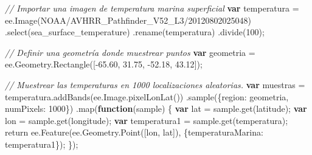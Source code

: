 \documentclass[
  12pt,
  letterpaper,
  twoside]{book}
\newenvironment{Shaded}{\begin{snugshade}}{\end{snugshade}}
\newcommand{\AttributeTok}[1]{\textcolor[rgb]{0.48,0.12,0.64}{#1}}
\newcommand{\CommentTok}[1]{\textcolor[rgb]{0.24,0.58,0.00}{\textit{#1}}}
\newcommand{\ControlFlowTok}[1]{\textcolor[rgb]{0.00,0.00,0.00}{#1}}
\newcommand{\DataTypeTok}[1]{\textcolor[rgb]{0.00,0.00,0.00}{#1}}
\newcommand{\DecValTok}[1]{\textcolor[rgb]{0.28,0.53,0.93}{#1}}
\newcommand{\FloatTok}[1]{\textcolor[rgb]{0.28,0.53,0.93}{#1}}
\newcommand{\FunctionTok}[1]{\textcolor[rgb]{0.48,0.12,0.64}{#1}}
\newcommand{\KeywordTok}[1]{\textcolor[rgb]{0.00,0.00,0.00}{\textbf{#1}}}
\newcommand{\NormalTok}[1]{#1}
\newcommand{\OperatorTok}[1]{\textcolor[rgb]{0.00,0.00,0.00}{#1}}
\newcommand{\StringTok}[1]{\textcolor[rgb]{0.87,0.29,0.22}{#1}}
\begin{document}
\begin{Shaded}
\begin{Highlighting}[]
\CommentTok{// Importar una imagen de temperatura marina superficial}
\KeywordTok{var}\NormalTok{ temperatura }\OperatorTok{=}\NormalTok{ ee}\OperatorTok{.}\FunctionTok{Image}\NormalTok{(}\StringTok{\textquotesingle{}NOAA/AVHRR\_Pathfinder\_V52\_L3/20120802025048\textquotesingle{}}\NormalTok{)}
  \OperatorTok{.}\FunctionTok{select}\NormalTok{(}\StringTok{\textquotesingle{}sea\_surface\_temperature\textquotesingle{}}\NormalTok{)}
  \OperatorTok{.}\FunctionTok{rename}\NormalTok{(}\StringTok{\textquotesingle{}temperatura\textquotesingle{}}\NormalTok{)}
  \OperatorTok{.}\FunctionTok{divide}\NormalTok{(}\DecValTok{100}\NormalTok{)}\OperatorTok{;}

\CommentTok{// Definir una geometría donde muestrear puntos}
\KeywordTok{var}\NormalTok{ geometria }\OperatorTok{=}\NormalTok{ ee}\OperatorTok{.}\AttributeTok{Geometry}\OperatorTok{.}\FunctionTok{Rectangle}\NormalTok{([}\OperatorTok{{-}}\FloatTok{65.60}\OperatorTok{,} \FloatTok{31.75}\OperatorTok{,} \OperatorTok{{-}}\FloatTok{52.18}\OperatorTok{,} \FloatTok{43.12}\NormalTok{])}\OperatorTok{;}

\CommentTok{// Muestrear las temperaturas en 1000 localizaciones aleatorias.}
\KeywordTok{var}\NormalTok{ muestras }\OperatorTok{=}\NormalTok{ temperatura}\OperatorTok{.}\FunctionTok{addBands}\NormalTok{(ee}\OperatorTok{.}\AttributeTok{Image}\OperatorTok{.}\FunctionTok{pixelLonLat}\NormalTok{())}
  \OperatorTok{.}\FunctionTok{sample}\NormalTok{(\{}\DataTypeTok{region}\OperatorTok{:}\NormalTok{ geometria}\OperatorTok{,} \DataTypeTok{numPixels}\OperatorTok{:} \DecValTok{1000}\NormalTok{\})}
  \OperatorTok{.}\FunctionTok{map}\NormalTok{(}\KeywordTok{function}\NormalTok{(sample) \{}
    \KeywordTok{var}\NormalTok{ lat }\OperatorTok{=}\NormalTok{ sample}\OperatorTok{.}\FunctionTok{get}\NormalTok{(}\StringTok{\textquotesingle{}latitude\textquotesingle{}}\NormalTok{)}\OperatorTok{;}
    \KeywordTok{var}\NormalTok{ lon }\OperatorTok{=}\NormalTok{ sample}\OperatorTok{.}\FunctionTok{get}\NormalTok{(}\StringTok{\textquotesingle{}longitude\textquotesingle{}}\NormalTok{)}\OperatorTok{;}
    \KeywordTok{var}\NormalTok{ temperatura1 }\OperatorTok{=}\NormalTok{ sample}\OperatorTok{.}\FunctionTok{get}\NormalTok{(}\StringTok{\textquotesingle{}temperatura\textquotesingle{}}\NormalTok{)}\OperatorTok{;}
    \ControlFlowTok{return}\NormalTok{ ee}\OperatorTok{.}\FunctionTok{Feature}\NormalTok{(ee}\OperatorTok{.}\AttributeTok{Geometry}\OperatorTok{.}\FunctionTok{Point}\NormalTok{([lon}\OperatorTok{,}\NormalTok{ lat])}\OperatorTok{,} 
\NormalTok{    \{}\DataTypeTok{temperaturaMarina}\OperatorTok{:}\NormalTok{ temperatura1\})}\OperatorTok{;}
\NormalTok{  \})}\OperatorTok{;}


\end{Highlighting}
\end{Shaded}
\end{document}
